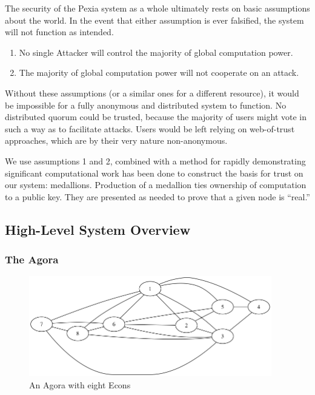 \documentclass{article}
\newcommand{\mesh}{Pexia}
\begin{document}
The security of the \mesh{} system as a whole ultimately rests on basic assumptions about the world. In the event that either assumption is ever falsified, the system will not function as intended.

\begin{enumerate}
    \item No single Attacker will control the majority of global computation power.
    \item The majority of global computation power will not cooperate on an attack.
\end{enumerate}

Without these assumptions (or a similar ones for a different resource), it would be impossible for a fully anonymous and distributed system to function. No distributed quorum could be trusted, because the majority of users might vote in such a way as to facilitate attacks. Users would be left relying on web-of-trust approaches, which are by their very nature non-anonymous.

We use assumptions 1 and 2, combined with a method for rapidly demonstrating significant computational work has been done to construct the basis for trust on our system: medallions. Production of a medallion ties ownership of computation to a public key. They are presented as needed to prove that a given node is “real.”

\subsection{High-Level System Overview}

\subsubsection{The Agora}

\begin{figure}[htbp]
  \centering
  \includegraphics[width = 300pt]{agoraOverview}
  \caption{An Agora with eight Econs}
\end{figure}
\end{document}
